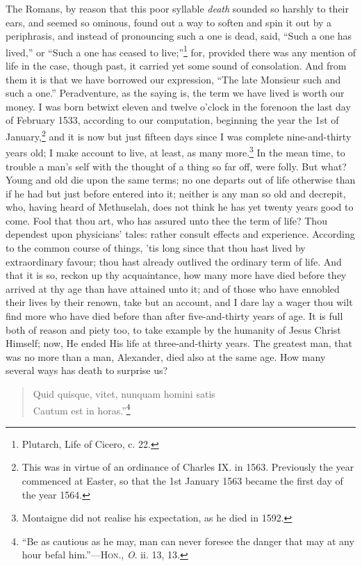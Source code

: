 The Romans, by reason that this poor syllable \textit{death} sounded
so harshly to their ears, and seemed so ominous, found out a way to
soften and spin it out by a periphrasis, and instead of pronouncing
such a one is dead, said, ``Such a one has lived,'' or ``Such a one
has ceased to live;''\footnote{Plutarch, Life of Cicero, c. 22.} for,
provided there was any mention of life in the case, though past, it
carried yet some sound of consolation. And from them it is that we
have borrowed our expression, ``The late Monsieur such and such a
one.'' Peradventure, as the saying is, the term we have lived is worth
our money. I was born betwixt eleven and twelve o'clock in the
forenoon the last day of February 1533, according to our computation,
beginning the year the 1st of January,\footnote{This was in virtue of
an ordinance of Charles IX. in 1563. Previously the year commenced at
Easter, so that the 1st January 1563 became the first day of the year
1564.} and it is now but just fifteen days since I was complete
nine-and-thirty years old; I make account to live, at least, as many
more.\footnote{Montaigne did not realise his expectation, as he died
in 1592.} In the mean time, to trouble a man's self with the thought
of a thing so far off, were folly. But what? Young and old die upon
the same terms; no one departs out of life otherwise than if he had
but just before entered into it; neither is any man so old and
decrepit, who, having heard of Methuselah, does not think he has yet
twenty years good to come. Fool that thou art, who has assured unto
thee the term of life? Thou dependest upon physicians' tales: rather
consult effects and experience. According to the common course of
things, 'tis long since that thou hast lived by extraordinary favour;
thou hast already outlived the ordinary term of life. And that it is
so, reckon up  thy acquaintance, how many more have died
before they arrived at thy age than have attained unto it; and of
those who have ennobled their lives by their renown, take but an
account, and I dare lay a wager thou wilt find more who have died
before than after five-and-thirty years of age. It is full both of
reason and piety too, to take example by the humanity of Jesus Christ
Himself; now, He ended His life at three-and-thirty years. The
greatest man, that was no more than a man, Alexander, died also at the
same age. How many several ways has death to surprise us?

\begin{verse}
Quid quisque, vitet, nunquam homini satis\\
Cautum est in horas.''\footnote{``Be as cautious as he may, man can
never foresee the danger that may at any hour befal
him.''---\textsc{Hon}., \textit{O}. ii. 13, 13.}
\end{verse}

